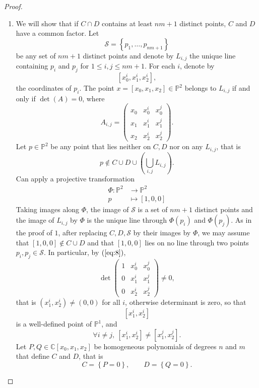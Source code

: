 \documentclass{article}
\newcommand{\C}{\mathbb{C}}
\renewcommand{\P}{\mathbb{P}}
\renewcommand{\S}{\mathcal{S}}
\newcommand{\rb}[1]{\left( #1 \right)}
\renewcommand{\sb}[1]{\left[ #1 \right]}
\newcommand{\cb}[1]{\left\{ #1 \right\}}
\theoremstyle{definition}\newtheorem{definition}{Definition}[section]
\theoremstyle{definition}\newtheorem{notation}[definition]{Notation}
\theoremstyle{definition}\newtheorem{remark}[definition]{Remark}
\theoremstyle{definition}\newtheorem{example1}[definition]{Example}
\theoremstyle{definition}\newtheorem{fact}{Fact}
\theoremstyle{definition}\newtheorem{exercise}{Exercise}
\theoremstyle{definition}\newtheorem*{example2}{Example}
\begin{document}
\begin{proof}
\begin{enumerate}

\item We will show that if $ C \cap D $ contains at least $ nm + 1 $ distinct points, $ C $ and $ D $ have a common factor. Let
$$ \S = \cb{p_1, \dots, p_{nm + 1}} $$
be any set of $ nm + 1 $ distinct points and denote by $ L_{i, j} $ the unique line containing $ p_i $ and $ p_j $ for $ 1 \le i, j \le nm + 1 $. For each $ i $, denote by
$$ \sb{x_0^i, x_1^i, x_2^i}, $$
the coordinates of $ p_i $. The point $ x = \sb{x_0, x_1, x_2} \in \P^2 $ belongs to $ L_{i, j} $ if and only if $ \det\rb{A} = 0 $, where
\begin{equation}
\label{eq:8}
A_{i, j} = \begin{pmatrix}
x_0 & x_0^i & x_0^j \\
x_1 & x_1^i & x_1^j \\
x_2 & x_2^i & x_2^j
\end{pmatrix}.
\end{equation}
Let $ p \in \P^2 $ be any point that lies neither on $ C, D $ nor on any $ L_{i, j} $, that is
$$ p \notin C \cup D \cup \rb{\bigcup_{i, j} L_{i, j}}. $$
Can apply a projective transformation
\begin{align*}
\Phi : \P^2 & \to \P^2 \\
p & \mapsto \sb{1, 0, 0}
\end{align*}
Taking images along $ \Phi $, the image of $ \S $ is a set of $ nm + 1 $ distinct points and the image of $ L_{i, j} $ by $ \Phi $ is the unique line through $ \Phi\rb{p_i} $ and $ \Phi\rb{p_j} $. As in the proof of $ 1 $, after replacing $ C, D, \S $ by their images by $ \Phi $, we may assume that $ \sb{1, 0, 0} \notin C \cup D $ and that $ \sb{1, 0, 0} $ lies on no line through two points $ p_i, p_j \in \S $. In particular, by $ \rb{\ref{eq:8}} $,
$$ \det\begin{pmatrix}
1 & x_0^i & x_0^j \\
0 & x_1^i & x_1^j \\
0 & x_2^i & x_2^j
\end{pmatrix} \ne 0, $$
that is $ \rb{x_1^i, x_2^i} \ne \rb{0, 0} $ for all $ i $, otherwise determinant is zero, so that
$$ \sb{x_1^i, x_2^i} $$
is a well-defined point of $ \P^1 $, and
$$ \forall i \ne j, \ \sb{x_1^i, x_2^i} \ne \sb{x_1^j, x_2^j}. $$
Let $ P, Q \in \C\sb{x_0, x_1, x_2} $ be homogeneous polynomials of degrees $ n $ and $ m $ that define $ C $ and $ D $, that is
$$ C = \cb{P = 0}, \qquad D = \cb{Q = 0}. $$

\end{enumerate}
\end{proof}
\end{document}

